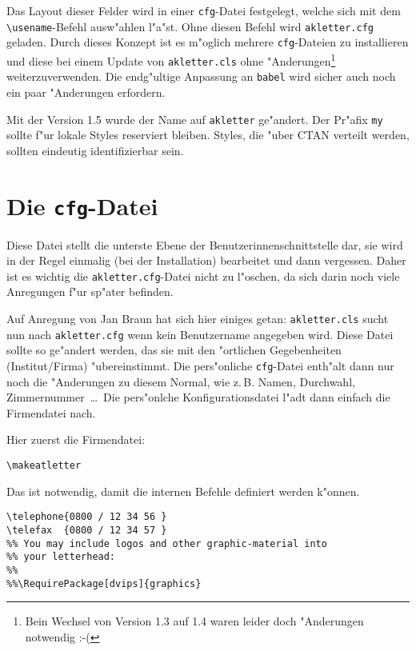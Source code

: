 \documentclass[a4paper]{article}
\begin{document}
Das Layout dieser Felder wird in einer \texttt{cfg}-Datei 
festgelegt, welche sich mit dem \verb+\usename+-Befehl ausw"ahlen 
l"a"st. Ohne diesen Befehl wird \texttt{akletter.cfg} geladen. 
Durch dieses Konzept ist es m"oglich mehrere \texttt{cfg}-Dateien 
zu installieren und diese bei einem Update von 
\texttt{akletter.cls} ohne "Anderungen\footnote{Bein Wechsel von 
Version 1.3 auf 1.4 waren leider doch "Anderungen notwendig :-(} 
weiterzuverwenden. Die endg"ultige Anpassung an \texttt{babel} wird
sicher auch noch ein paar "Anderungen erfordern.

Mit der Version 1.5 wurde der Name auf \texttt{akletter} ge"andert. 
Der Pr"afix \texttt{my} sollte f"ur lokale Styles reserviert bleiben. 
Styles, die "uber CTAN verteilt werden, sollten eindeutig 
identifizierbar sein. 

\section{Die \texttt{cfg}-Datei}

Diese Datei stellt die unterste Ebene der 
Benutzerinnenschnittstelle dar, sie wird in der Regel einmalig 
(bei der Installation) bearbeitet und dann vergessen. Daher ist 
es wichtig die \texttt{akletter.cfg}-Datei nicht zu l"oschen, da 
sich darin noch viele Anregungen f"ur sp"ater befinden.

Auf Anregung von Jan Braun hat sich hier einiges getan:
\texttt{akletter.cls} sucht nun nach \texttt{akletter.cfg} wenn 
kein Benutzername angegeben wird. Diese Datei sollte so ge"andert 
werden, das sie mit den "ortlichen Gegebenheiten (Institut/Firma) 
"ubereinstimmt. Die pers"onliche \texttt{cfg}-Datei enth"alt dann 
nur noch die "Anderungen zu diesem Normal, wie z.\,B. Namen, 
Durchwahl, Zimmernummer~\dots\ Die pers"onlche Konfigurationsdatei 
l"adt dann einfach die Firmendatei nach.

Hier zuerst die Firmendatei:

\begin{verbatim}
\makeatletter
\end{verbatim}

Das ist notwendig, damit die internen Befehle definiert werden 
k"onnen.

\begin{verbatim}
\telephone{0800 / 12 34 56 }
\telefax  {0800 / 12 34 57 }
%% You may include logos and other graphic-material into
%% your letterhead:
%%
%%\RequirePackage[dvips]{graphics}
\end{verbatim}
\end{document}
